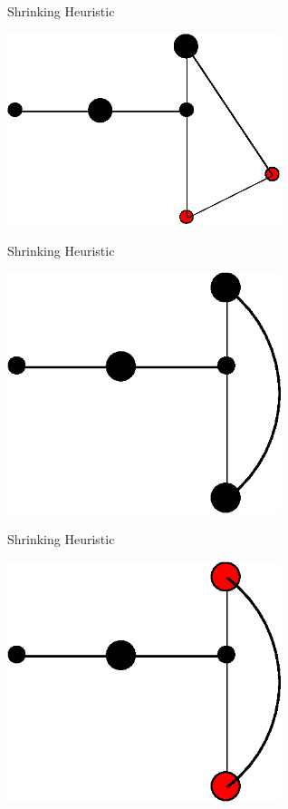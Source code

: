 \documentclass[10pt]{beamer}
\begin{document}
\begin{frame}{Shrinking Heuristic}
\begin{example}
    \begin{center}
            \includegraphics[width=8cm]{Shrinking06.eps} 
    \end{center}
\end{example}
\end{frame}

\begin{frame}{Shrinking Heuristic}
\begin{example}
    \begin{center}
            \includegraphics[width=8cm]{Shrinking07.eps} 
    \end{center}
\end{example}
\end{frame}

\begin{frame}{Shrinking Heuristic}
\begin{example}
    \begin{center}
            \includegraphics[width=8cm]{Shrinking08.eps} 
    \end{center}
\end{example}
\end{frame}
\end{document}

